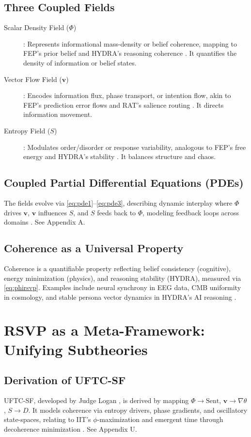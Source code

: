 \documentclass[12pt]{report}
\newcommand{\PhiRSVP}{\Phi}
\newcommand{\vRSVP}{\mathbf{v}}
\newcommand{\SRSVP}{S}
\begin{document}
\section{Three Coupled Fields}
\begin{description}
    \item[Scalar Density Field (\(\PhiRSVP\))]: Represents informational mass-density or belief coherence, mapping to FEP’s prior belief \citep{Friston2010} and HYDRA’s reasoning coherence \citep{HYDRA2025}. It quantifies the density of information or belief states.
    \item[Vector Flow Field (\(\vRSVP\))]: Encodes information flux, phase transport, or intention flow, akin to FEP’s prediction error flows and RAT’s salience routing \citep{RAT2025}. It directs information movement.
    \item[Entropy Field (\(\SRSVP\))]: Modulates order/disorder or response variability, analogous to FEP’s free energy and HYDRA’s stability \citep{Friston2010, HYDRA2025}. It balances structure and chaos.
\end{description}

\section{Coupled Partial Differential Equations (PDEs)}
The fields evolve via \eqref{eq:pde1}--\eqref{eq:pde3}, describing dynamic interplay where \(\PhiRSVP\) drives \(\vRSVP\), \(\vRSVP\) influences \(\SRSVP\), and \(\SRSVP\) feeds back to \(\PhiRSVP\), modeling feedback loops across domains \citep{RSVPMeta2025}. See Appendix A.

\section{Coherence as a Universal Property}
Coherence is a quantifiable property reflecting belief consistency (cognitive), energy minimization (physics), and reasoning stability (HYDRA), measured via \eqref{eq:phirsvp}. Examples include neural synchrony in EEG data, CMB uniformity in cosmology, and stable persona vector dynamics in HYDRA’s AI reasoning \citep{RSVPMeta2025, HYDRA2025}.

\chapter{RSVP as a Meta-Framework: Unifying Subtheories}
\section{Derivation of UFTC-SF}
UFTC-SF, developed by Judge Logan \citep{Logan2025}, is derived by mapping \(\PhiRSVP \to \text{Sent}\), \(\vRSVP \to \nabla\theta\), \(\SRSVP \to D\). It models coherence via entropy drivers, phase gradients, and oscillatory state-spaces, relating to IIT’s \(\phi\)-maximization and emergent time through decoherence minimization \citep{Tononi2016}. See Appendix U.
\end{document}
